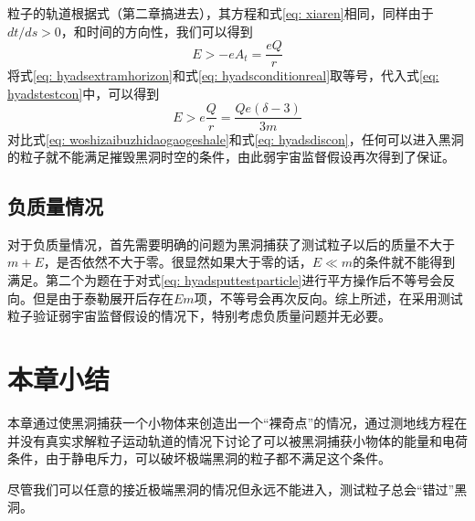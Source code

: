粒子的轨道根据式（第二章搞进去），其方程和式\eqref{eq: xiaren}相同，同样由于$dt/ds>0$，和时间的方向性，我们可以得到
\begin{equation}\label{eq: hyadstestcon}
    E>-eA_t=\frac{eQ}{r}
\end{equation}
将式\eqref{eq: hyadsextramhorizon}和式\eqref{eq: hyadsconditionreal}取等号，代入式\eqref{eq: hyadstestcon}中，可以得到
\begin{equation}\label{eq: woshizaibuzhidaogaogeshale}
    E > e\frac{Q}{r}=\frac{Q e \left(\delta-3\right)}{3 m} 
\end{equation}
对比式\eqref{eq: woshizaibuzhidaogaogeshale}和式\eqref{eq: hyadsdiscon}，任何可以进入黑洞的粒子就不能满足摧毁黑洞时空的条件，由此弱宇宙监督假设再次得到了保证。
\subsection{负质量情况}
对于负质量情况，首先需要明确的问题为黑洞捕获了测试粒子以后的质量不大于$m+E$，是否依然不大于零。很显然如果大于零的话，$E \ll m$的条件就不能得到满足。第二个为题在于对式\eqref{eq: hyadsputtestparticle}进行平方操作后不等号会反向。但是由于泰勒展开后存在$E m $项，不等号会再次反向。综上所述，在采用测试粒子验证弱宇宙监督假设的情况下，特别考虑负质量问题并无必要。

\section{本章小结}
本章通过使黑洞捕获一个小物体来创造出一个“裸奇点”的情况，通过测地线方程在并没有真实求解粒子运动轨道的情况下讨论了可以被黑洞捕获小物体的能量和电荷条件，由于静电斥力，可以破坏极端黑洞的粒子都不满足这个条件。

尽管我们可以任意的接近极端黑洞的情况但永远不能进入，测试粒子总会“错过”黑洞。
